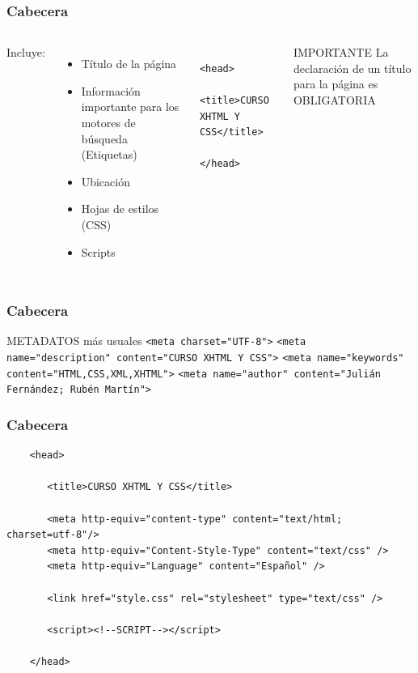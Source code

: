 \documentclass{beamer}
\begin{document}
\begin{frame}[fragile] %
\frametitle{Cabecera}
	\begin{columns}[c]
	Incluye:
	\begin{itemize}
	\item Título de la página
	\item Información importante para los motores de búsqueda (Etiquetas)
	\item Ubicación
	\item Hojas de estilos (CSS)
	\item Scripts
	\end{itemize}
	\scriptsize{
		\begin{verbatim}
		<head>
		   <title>CURSO XHTML Y CSS</title>
		</head>
		\end{verbatim}
	}
	\begin{alertblock}{IMPORTANTE}
	La declaración de un título para la página es OBLIGATORIA
	\end{alertblock}
	\end{columns}
\end{frame}

\begin{frame}[fragile] %
\frametitle{Cabecera}
	\begin{block}{METADATOS más usuales}
	\scriptsize{\verb|<meta charset="UTF-8">|}
	\scriptsize{\verb|<meta name="description" content="CURSO XHTML Y CSS">|}
	\scriptsize{\verb|<meta name="keywords" content="HTML,CSS,XML,XHTML">|}
	\scriptsize{\verb|<meta name="author" content="Julián Fernández; Rubén Martín">|}
	\end{block}
\end{frame}

\begin{frame}[fragile] %
\frametitle{Cabecera}
	\scriptsize{
	\begin{verbatim}
	<head>
	
	   <title>CURSO XHTML Y CSS</title>
	   
	   <meta http-equiv="content-type" content="text/html; charset=utf-8"/>
	   <meta http-equiv="Content-Style-Type" content="text/css" />
	   <meta http-equiv="Language" content="Español" />

	   <link href="style.css" rel="stylesheet" type="text/css" />

	   <script><!--SCRIPT--></script>

	</head>
	\end{verbatim}
	}
\end{frame}
\end{document}
